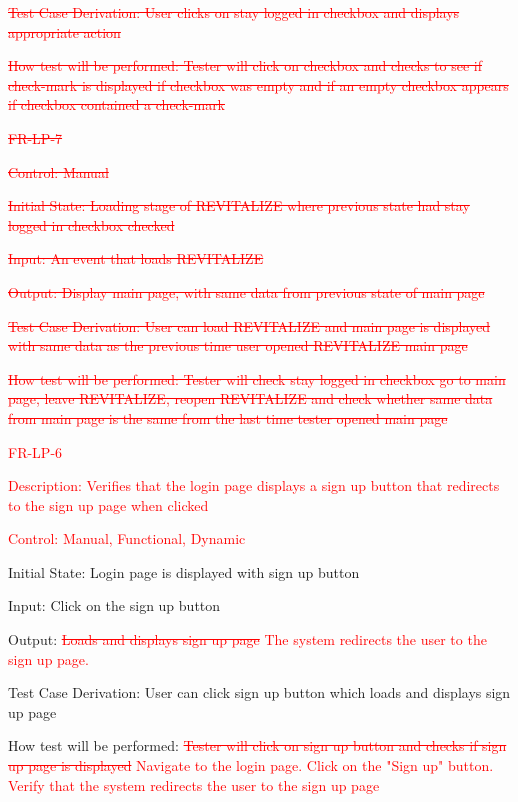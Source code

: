 \documentclass[12pt, titlepage]{article}
\begin{document}
\begin{enumerate}
\textcolor{red}{\sout{Test Case Derivation: User clicks on stay logged in checkbox and displays appropriate action}}

\textcolor{red}{\sout{How test will be performed: Tester will click on checkbox and checks to see if check-mark is displayed if checkbox was empty and if an empty checkbox appears if checkbox contained a check-mark}}

\item{\textcolor{red}{\sout{FR-LP-7}}\\}

\textcolor{red}{\sout{Control: Manual}}

\textcolor{red}{\sout{Initial State: Loading stage of REVITALIZE where previous state had stay logged in checkbox checked}}

\textcolor{red}{\sout{Input: An event that loads REVITALIZE}}

\textcolor{red}{\sout{Output: Display main page, with same data from previous state of main page}}

\textcolor{red}{\sout{Test Case Derivation: User can load REVITALIZE and main page is displayed with same data as the previous time user opened REVITALIZE main page}}

\textcolor{red}{\sout{How test will be performed: Tester will check stay logged in checkbox go to main page, leave REVITALIZE, reopen REVITALIZE and check whether same data from main page is the same from the last time tester opened main page}}
	
        \textcolor{red}{\item{FR-LP-6\\}}

        \textcolor{red}{Description: Verifies that the login page displays a sign up button that redirects to the sign up page when clicked}
	
	\textcolor{red}{Control: Manual, Functional, Dynamic}
	
	Initial State: Login page is displayed with sign up button
	
	Input: Click on the sign up button
	
	Output: \textcolor{red}{\sout{Loads and displays sign up page}} \textcolor{red}{The system redirects the user to the sign up page.}
	
	Test Case Derivation: User can click sign up button which loads and displays sign up page
	
	How test will be performed: \textcolor{red}{\sout{Tester will click on sign up button and checks if sign up page is displayed}} \textcolor{red}{Navigate to the login page. Click on the "Sign up" button. Verify that the system redirects the user to the sign up page}
	

\end{enumerate}
\end{document}
